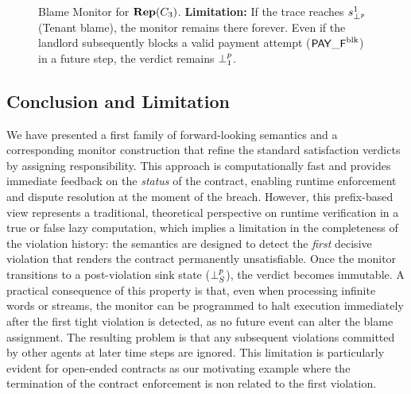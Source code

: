 \begin{example}
\begin{figure}[h!]
      \caption{Blame Monitor for $\mathbf{Rep}(C_3)$.
      \textbf{Limitation:} If the trace reaches $s_{\bot^p}^1$ (Tenant blame), the monitor remains there forever. Even if the landlord subsequently blocks a valid payment attempt ($\mathsf{PAY\_F}^{\text{blk}}$) in a future step, the verdict remains $\mathbin{\bot^{p}_{1}}$.}
      \label{fig:rep-c3_blame}
      \end{figure}
      \end{example}     
      
\subsection{Conclusion and Limitation}      
We have presented a first family of forward-looking semantics and a corresponding monitor construction that refine the standard satisfaction verdicts by assigning responsibility. 
This approach is computationally fast and provides immediate feedback on the \emph{status} of the contract, enabling runtime enforcement and dispute resolution at the moment of the breach.
However, this prefix-based view represents a traditional, theoretical perspective on runtime verification in a true or false lazy computation, which implies a limitation in the completeness of the violation history:
the semantics are designed to detect the \emph{first} decisive violation that renders the contract permanently unsatisfiable. Once the monitor transitions to a post-violation sink state ($\mathbin{\bot^{p}_{S}}$), the verdict becomes immutable. 
A practical consequence of this property is that, even when processing infinite words or streams, the monitor can be programmed to halt execution immediately after the first tight violation is detected, as no future event can alter the blame assignment. The resulting problem is that any subsequent violations committed by other agents at later time steps are ignored. This limitation is particularly evident for open-ended contracts as our motivating example where the termination of the contract enforcement is non related to the first violation. 

